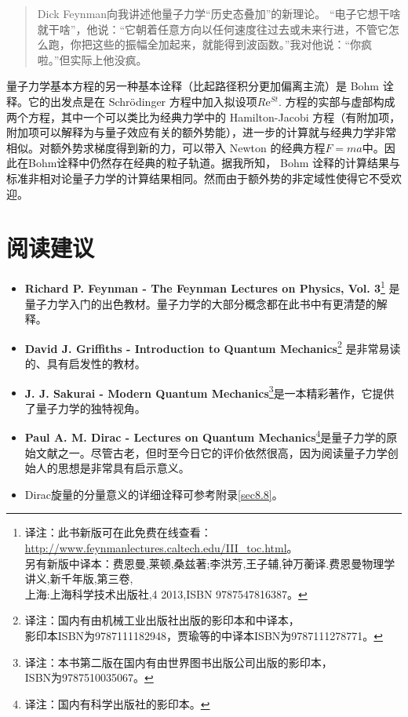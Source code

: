 \begin{quote}
Dick Feynman向我讲述他量子力学“历史态叠加”的新理论。 “电子它想干啥就干啥”，他说：“它朝着任意方向以任何速度往过去或未来行进，不管它怎么跑，你把这些的振幅全加起来，就能得到波函数。”我对他说：“你疯啦。”但实际上他没疯。
\end{quote}

量子力学基本方程的另一种基本诠释（比起路径积分更加偏离主流）是 Bohm 诠释。它的出发点是在 Schr\"{o}dinger 方程中加入拟设项$R \mathrm{e}^{St}$. 方程的实部与虚部构成两个方程，其中一个可以类比为经典力学中的 Hamilton-Jacobi 方程（有附加项，附加项可以解释为与量子效应有关的额外势能），进一步的计算就与经典力学非常相似。对额外势求梯度得到新的力，可以带入 Newton 的经典方程$F = ma$中。因此在Bohm诠释中仍然存在经典的粒子轨道。据我所知， Bohm 诠释的计算结果与标准非相对论量子力学的计算结果相同。然而由于额外势的非定域性使得它不受欢迎。


\section*{阅读建议}
\begin{itemize}
\item {\bfseries Richard P. Feynman - The Feynman Lectures on Physics, Vol. 3}\footnote{译注：此书新版可在此免费在线查看： \url{http://www.feynmanlectures.caltech.edu/III_toc.html}。\\另有新版中译本：费恩曼,莱顿,桑兹著;李洪芳,王子辅,钟万蘅译.费恩曼物理学讲义,新千年版,第三卷,\\上海:上海科学技术出版社,4 2013,ISBN 9787547816387。} 是量子力学入门的出色教材。量子力学的大部分概念都在此书中有更清楚的解释。
\item {\bfseries  David J. Griffiths - Introduction to Quantum Mechanics}\footnote{译注：国内有由机械工业出版社出版的影印本和中译本，\\影印本ISBN为9787111182948，贾瑜等的中译本ISBN为9787111278771。}
是非常易读的、具有启发性的教材。
\item {\bfseries  J. J. Sakurai - Modern Quantum Mechanics}\footnote{译注：本书第二版在国内有由世界图书出版公司出版的影印本，\\ISBN为9787510035067。}是一本精彩著作，它提供了量子力学的独特视角。
\item {\bfseries Paul A. M. Dirac - Lectures on Quantum Mechanics}\footnote{译注：国内有科学出版社的影印本。}是量子力学的原始文献之一。尽管古老，但时至今日它的评价依然很高，因为阅读量子力学创始人的思想是非常具有启示意义。
\item Dirac旋量的分量意义的详细诠释可参考附录\ref{sec8.8}。
\end{itemize}


